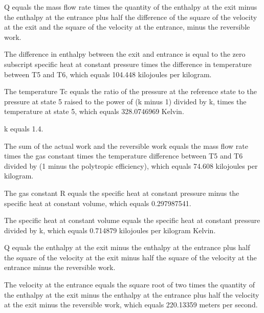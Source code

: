 Q equals the mass flow rate times the quantity of the enthalpy at the exit minus the enthalpy at the entrance plus half the difference of the square of the velocity at the exit and the square of the velocity at the entrance, minus the reversible work.

The difference in enthalpy between the exit and entrance is equal to the zero subscript specific heat at constant pressure times the difference in temperature between T5 and T6, which equals 104.448 kilojoules per kilogram.

The temperature Tc equals the ratio of the pressure at the reference state to the pressure at state 5 raised to the power of (k minus 1) divided by k, times the temperature at state 5, which equals 328.0746969 Kelvin.

k equals 1.4.

The sum of the actual work and the reversible work equals the mass flow rate times the gas constant times the temperature difference between T5 and T6 divided by (1 minus the polytropic efficiency), which equals 74.608 kilojoules per kilogram.

The gas constant R equals the specific heat at constant pressure minus the specific heat at constant volume, which equals 0.297987541.

The specific heat at constant volume equals the specific heat at constant pressure divided by k, which equals 0.714879 kilojoules per kilogram Kelvin.

Q equals the enthalpy at the exit minus the enthalpy at the entrance plus half the square of the velocity at the exit minus half the square of the velocity at the entrance minus the reversible work.

The velocity at the entrance equals the square root of two times the quantity of the enthalpy at the exit minus the enthalpy at the entrance plus half the velocity at the exit minus the reversible work, which equals 220.13359 meters per second.